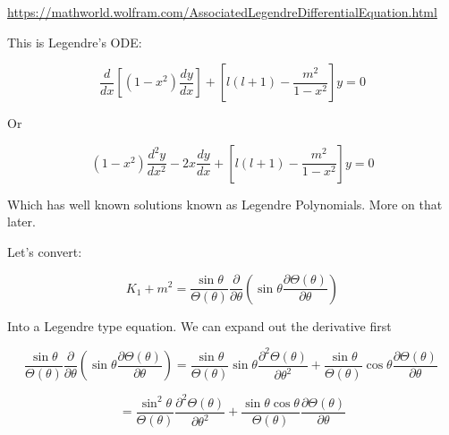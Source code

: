 \documentclass[12pt]{article}
\renewcommand{\_}{\kern-1.5pt\textunderscore\kern-1.5pt}
\begin{document}
\href{https://mathworld.wolfram.com/AssociatedLegendreDifferentialEquation.html}{https://mathworld.wolfram.com/AssociatedLegendreDifferentialEquation.html}\par


\vspace{\baselineskip}
This is Legendre’s ODE:\par

 \[ \frac{d}{dx} \left[  \left( 1-x^{2} \right) \frac{dy}{dx} \right] + \left[ l \left( l+1 \right) -\frac{m^{2}}{1-x^{2}} \right] y=0 \] \par

Or \par

 \[  \left( 1-x^{2} \right) \frac{d^{2}y}{dx^{2}}-2x\frac{dy}{dx}+ \left[ l \left( l+1 \right) -\frac{m^{2}}{1-x^{2}} \right] y=0 \] \par


\vspace{\baselineskip}
Which has well known solutions known as Legendre Polynomials. More on that later.\par

Let’s convert:\par

 \[ K_{1}+m^{2}=\frac{\sin  \theta }{ \Theta  \left(  \theta  \right) }\frac{ \partial }{ \partial  \theta } \left( \sin  \theta \frac{ \partial  \Theta  \left(  \theta  \right) }{ \partial  \theta } \right)  \] \par

Into a Legendre type equation. We can expand out the derivative first\par

 \[ \frac{\sin  \theta }{ \Theta  \left(  \theta  \right) }\frac{ \partial }{ \partial  \theta } \left( \sin  \theta \frac{ \partial  \Theta  \left(  \theta  \right) }{ \partial  \theta } \right) =\frac{\sin  \theta }{ \Theta  \left(  \theta  \right) }\sin  \theta \frac{ \partial ^{2} \Theta  \left(  \theta  \right) }{ \partial  \theta ^{2}}+\frac{\sin  \theta }{ \Theta  \left(  \theta  \right) }\cos  \theta \frac{ \partial  \Theta  \left(  \theta  \right) }{ \partial  \theta }~ \] \par

 \[ =\frac{\sin ^{2} \theta }{ \Theta  \left(  \theta  \right) }\frac{ \partial ^{2} \Theta  \left(  \theta  \right) }{ \partial  \theta ^{2}}+\frac{\sin  \theta \cos  \theta }{ \Theta  \left(  \theta  \right) }\frac{ \partial  \Theta  \left(  \theta  \right) }{ \partial  \theta } \] \par
\end{document}
